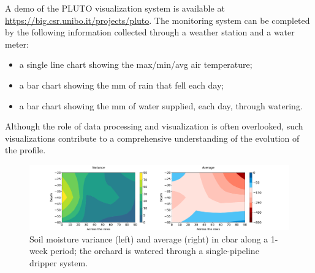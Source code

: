 A demo of the PLUTO visualization system is available at \url{https://big.csr.unibo.it/projects/pluto}. The monitoring system can be completed by the following information collected through a weather station and a water meter:
\begin{itemize}
    \item a single line chart showing the max/min/avg air temperature;
    \item a bar chart showing the mm of rain that fell each day;
    \item a bar chart showing the mm of water supplied, each day, through watering. 
\end{itemize}
Although the role of data processing and visualization is often overlooked, such visualizations contribute to a comprehensive understanding of the evolution of the profile.

\begin{figure}[t]
\centering
\includegraphics[scale=.25]{chapters/physics-aware/pluto/img/countor_plot_std_mean.pdf}
\caption{Soil moisture variance (left) and average (right) in cbar along a 1-week period; the orchard is watered through a single-pipeline dripper system.}
\label{pluto-fig:variazione-umidita-profilo}
\end{figure}

